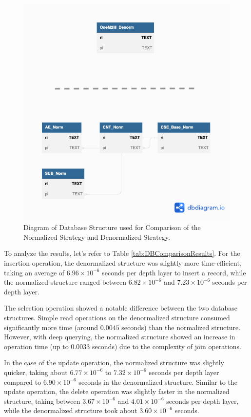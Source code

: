 \documentclass[a4paper,fleqn]{cas-dc}
\begin{document}
\begin{figure}[h]
	\centering
	\includegraphics[width=\linewidth]{TestComparisionDBsStrategies}
	\caption{Diagram of Database Structure used for Comparison of the Normalized Strategy and Denormalized Strategy.}
	\label{fig:TestComparisionDBsStrategies}
\end{figure}

To analyze the results, let's refer to Table \ref{tab:DBComparisonResults}. For the insertion operation, the denormalized structure was slightly more time-efficient, taking an average of $6.96 \times 10^{-6}$ seconds per depth layer to insert a record, while the normalized structure ranged between $6.82 \times 10^{-6}$ and $7.23 \times 10^{-6}$ seconds per depth layer.

The selection operation showed a notable difference between the two database structures. Simple read operations on the denormalized structure consumed significantly more time (around $0.0045$ seconds) than the normalized structure. However, with deep querying, the normalized structure showed an increase in operation time (up to $0.0033$ seconds) due to the complexity of join operations.

In the case of the update operation, the normalized structure was slightly quicker, taking about $6.77 \times 10^{-6}$ to $7.32 \times 10^{-6}$ seconds per depth layer compared to $6.90 \times 10^{-6}$ seconds in the denormalized structure. Similar to the update operation, the delete operation was slightly faster in the normalized structure, taking between $3.67 \times 10^{-6}$ and $4.01 \times 10^{-6}$ seconds per depth layer, while the denormalized structure took about $3.60 \times 10^{-6}$ seconds.
\end{document}
